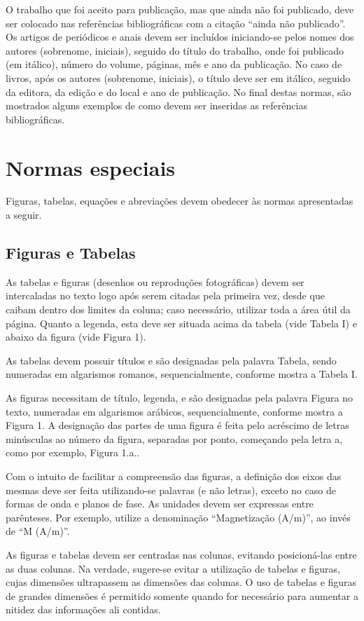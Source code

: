 \documentclass{ceel}
\begin{document}
\begin{multicols}{2}
\begin{enumerate}[1)]
O trabalho que foi aceito para publicação, mas que ainda não foi publicado, deve ser colocado nas referências bibliográficas com a citação “ainda não publicado”.
Os artigos de periódicos e anais devem ser incluídos iniciando-se pelos nomes dos autores (sobrenome, iniciais), seguido do título do trabalho, onde foi publicado (em itálico), número do volume, páginas, mês e ano da publicação. 
No caso de livros, após os autores (sobrenome, iniciais), o título deve ser em itálico, seguido da editora, da edição e do local e ano de publicação. 
No final destas normas, são mostrados alguns exemplos de como devem ser inseridas as referências bibliográficas.
\end{enumerate}
\section{Normas especiais}
Figuras, tabelas, equações e abreviações devem obedecer às normas apresentadas a seguir.
\subsection{Figuras e Tabelas}
As tabelas e figuras (desenhos ou reproduções fotográficas) devem ser intercaladas no texto logo após serem citadas pela primeira vez, desde que caibam dentro dos limites da coluna; caso necessário, utilizar toda a área útil da página. Quanto a legenda, esta deve ser situada acima da tabela (vide Tabela I) e abaixo da figura (vide Figura 1).

As tabelas devem possuir títulos e são designadas pela palavra Tabela, sendo numeradas em algarismos romanos, sequencialmente, conforme mostra a Tabela I.

As figuras necessitam de título, legenda, e são designadas pela palavra Figura no texto, numeradas em algarismos arábicos, sequencialmente, conforme mostra a Figura 1. A designação das partes de uma figura é feita pelo acréscimo de letras minúsculas ao número da figura, separadas por ponto, começando pela letra a, como por exemplo, Figura 1.a..

Com o intuito de facilitar a compreensão das figuras, a definição dos eixos das mesmas deve ser feita utilizando-se palavras (e não letras), exceto no caso de formas de onda e planos de fase. As unidades devem ser expressas entre parênteses. Por exemplo, utilize a denominação “Magnetização (A/m)”, ao invés de “M (A/m)”.

As figuras e tabelas devem ser centradas nas colunas, evitando posicioná-las entre as duas colunas. Na verdade, sugere-se evitar a utilização de tabelas e figuras, cujas dimensões ultrapassem as dimensões das colunas. O uso de tabelas e figuras de grandes dimensões é permitido somente quando for necessário para aumentar a nitidez das informações ali contidas.


\end{multicols}
\end{document}
